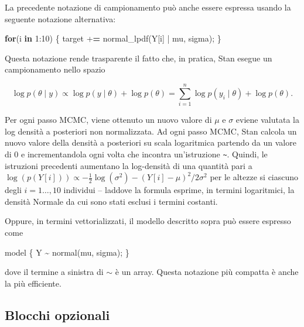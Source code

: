 \documentclass[
  11pt,
]{krantz}
\makeatletter
\newenvironment{Shaded}{\begin{snugshade}}{\end{snugshade}}
\newcommand{\ControlFlowTok}[1]{\textcolor[rgb]{0.27,0.27,0.27}{\textbf{#1}}}
\newcommand{\DecValTok}[1]{\textcolor[rgb]{0.06,0.06,0.06}{#1}}
\newcommand{\ErrorTok}[1]{\textcolor[rgb]{0.14,0.14,0.14}{\textbf{#1}}}
\newcommand{\FunctionTok}[1]{\textcolor[rgb]{0,0,0}{#1}}
\newcommand{\NormalTok}[1]{#1}
\newcommand{\SpecialCharTok}[1]{\textcolor[rgb]{0,0,0}{#1}}
\newenvironment{kframe}{%
\medskip{}
\setlength{\fboxsep}{.8em}
 \def\at@end@of@kframe{}%
 \ifinner\ifhmode%
  \def\at@end@of@kframe{\end{minipage}}%
  \begin{minipage}{\columnwidth}%
 \fi\fi%
 \def\FrameCommand##1{\hskip\@totalleftmargin \hskip-\fboxsep
 \colorbox{shadecolor}{##1}\hskip-\fboxsep
     \hskip-\linewidth \hskip-\@totalleftmargin \hskip\columnwidth}%
 \MakeFramed {\advance\hsize-\width
   \@totalleftmargin\z@ \linewidth\hsize
   \@setminipage}}%
 {\par\unskip\endMakeFramed%
 \at@end@of@kframe}
\renewenvironment{Shaded}{\begin{kframe}}{\end{kframe}}
\theoremstyle{definition}
\theoremstyle{definition}
\theoremstyle{definition}
\theoremstyle{definition}
\theoremstyle{remark}
\makeatother
\begin{document}
La precedente notazione di campionamento può anche essere espressa usando la seguente notazione alternativa:

\begin{Shaded}
\begin{Highlighting}[]
  \ControlFlowTok{for}\NormalTok{(i }\ControlFlowTok{in} \DecValTok{1}\SpecialCharTok{:}\DecValTok{10}\NormalTok{) \{}
\NormalTok{    target }\SpecialCharTok{+}\ErrorTok{=} \FunctionTok{normal\_lpdf}\NormalTok{(Y[i] }\SpecialCharTok{|}\NormalTok{ mu, sigma);}
\NormalTok{  \}}
\end{Highlighting}
\end{Shaded}

Questa notazione rende trasparente il fatto che, in pratica, Stan esegue un campionamento nello spazio

\[
\log p(\theta \mid y) \propto \log p(y \mid \theta) + \log p(\theta) = \sum_{i=1}^n \log p(y_i \mid \theta) + \log p(\theta).
\]

Per ogni passo MCMC, viene ottenuto un nuovo valore di \(\mu\) e \(\sigma\) eviene valutata la log densità a posteriori non normalizzata. Ad ogni passo MCMC, Stan calcola un nuovo valore della densità a posteriori su scala logaritmica partendo da un valore di 0 e incrementandola ogni volta che incontra un'istruzione \texttt{\textasciitilde{}}. Quindi, le istruzioni precedenti aumentano la log-densità di una quantità pari a \(\log (p(Y[i])) \propto -\frac{1}{2} \log(\sigma^2) - (Y[i]-\mu)^2 / 2\sigma^2\) per le altezze si ciascuno degli \(i=1 \dots, 10\) individui -- laddove la formula esprime, in termini logaritmici, la densità Normale da cui sono stati esclusi i termini costanti.

Oppure, in termini vettorializzati, il modello descritto sopra può essere espresso come

\begin{Shaded}
\begin{Highlighting}[]
\NormalTok{model \{}
\NormalTok{  Y }\SpecialCharTok{\textasciitilde{}} \FunctionTok{normal}\NormalTok{(mu, sigma);}
\NormalTok{\}}
\end{Highlighting}
\end{Shaded}

dove il termine a sinistra di \(\sim\) è un array. Questa notazione più compatta è anche la più efficiente.

\hypertarget{blocchi-opzionali}{%
\subsection{Blocchi opzionali}\label{blocchi-opzionali}}
\end{document}
